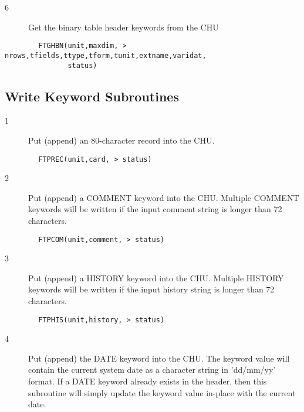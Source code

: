 \documentclass[11pt]{book}
\begin{document}
\begin{description}
\item[6 ]Get the binary table header keywords from the CHU
\end{description}

\begin{verbatim}
        FTGHBN(unit,maxdim, > nrows,tfields,ttype,tform,tunit,extname,varidat,
               status)
\end{verbatim}

\subsection{Write Keyword Subroutines \label{FTPREC}}


\begin{description}
\item[1 ]Put (append) an 80-character record into the CHU.
\end{description}

\begin{verbatim}
        FTPREC(unit,card, > status)
\end{verbatim}

\begin{description}
\item[2 ] Put (append) a COMMENT keyword into the CHU.  Multiple COMMENT keywords
   will be written if the input comment string is longer than 72 characters.
\end{description}

\begin{verbatim}
        FTPCOM(unit,comment, > status)
\end{verbatim}

\begin{description}
\item[3 ]Put (append) a HISTORY keyword into the CHU.  Multiple HISTORY keywords
   will be written if the input history string is longer than 72 characters.
\end{description}

\begin{verbatim}
        FTPHIS(unit,history, > status)
\end{verbatim}

\begin{description}
\item[4 ] Put (append) the DATE keyword into the CHU.  The keyword value will contain
    the current system date as a character string in 'dd/mm/yy' format. If
    a DATE keyword already exists in the header, then this subroutine will
   simply update the keyword value in-place with the current date.
\end{description}
\end{document}
